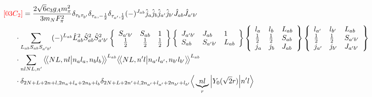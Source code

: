 \documentclass[master]{shnuthesis}
\newcommand{\llangle}{\big\langle\!\big\langle}
\newcommand{\rrangle}{\big\rangle\!\big\rangle}
\newcommand{\ap}{a^\prime}
\newcommand{\bp}{b^\prime}
\newcommand{\il}{\!\!\!\!\!\!\!\!\!\!}
\begin{document}
\begin{align}
    &\il {\color{red} [03C_2]}= \frac{2\sqrt{6}c_3g_A m_\pi^2}{3m_N F_{\pi}^2} \delta_{\tau_b \tau_{\bp}}\delta_{\tau_a, -\frac{1}{2}}\delta_{\tau_{\ap}, \frac{1}{2}} (-)^{J_{ab}}\hat{j}_a\hat{j}_b\hat{j}_{\ap}\hat{j}_{\bp}\hat{J}_{ab}\hat{J}_{\ap\bp}  \notag\\
    & \cdot \sum_{L_{ab}S_{ab}S_{\ap\bp}} (-)^{L_{ab}} \hat{L}_{ab}^2\hat{S}_{ab}^2\hat{S}_{\ap\bp}^2  \left\{\begin{array}{ccc} S_{\ap\bp} & S_{ab} & 1 \\ \frac{1}{2} & \frac{1}{2} & \frac{1}{2} \end{array}\right\}  \left\{\begin{array}{lll} J_{\ap\bp} & J_{ab} & 1 \\ S_{ab} & S_{\ap\bp} & L_{ab} \end{array}\right\}  \left\{\begin{array}{lll}l_{a} & l_{b} & L_{ab} \\ \frac{1}{2} & \frac{1}{2} & S_{ab} \\j_{a} & j_{b} & J_{ab} \end{array}\right\} \left\{\begin{array}{lll} l_{\ap} & l_{\bp} & L_{ab} \\ \frac{1}{2} & \frac{1}{2} & S_{\ap\bp} \\j_{\ap} & j_{\bp} & J_{\ap\bp} \end{array}\right\}  \notag \\
    & \cdot \sum_{nlNL,n^\prime} \llangle N L, n l \big| n_{a} l_{a}, n_{b} l_{b} \rrangle^{L_{ab}} \llangle N L, n^\prime l \big| n_{a^\prime} l_{a^\prime}, n_{b^\prime} l_{b^\prime} \rrangle^{L_{ab}} \notag\\
    & \cdot \delta_{2N+L+2n+l,2n_a+l_a+2n_b+l_b}\delta_{2N+L+2n^\prime+l,2n_{a^\prime}+l_{a^\prime}+2n_{b^\prime}+l_{b^\prime}} \Big\langle \underbrace{n l}_{r} \Big| Y_0(\sqrt{2}r) \Big| n^\prime l \Big\rangle
\end{align}
\,\\
\end{document}
